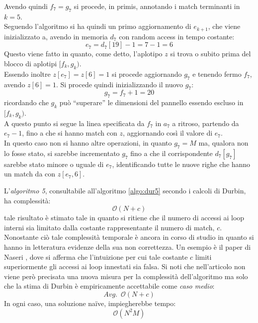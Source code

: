 \begin{esempio}
  Avendo quindi $f_7=g_7$ si procede, in primis, annotando i match terminanti in
  $k=5$.\\
  Seguendo l'algoritmo si ha quindi un primo aggiornamento di $e_{k+1}$, che
  viene inizializzato a, avendo in memoria $d_7$ con random access in tempo
  costante: 
  \[e_7=d_7[19]-1=7-1=6\]
  Questo viene fatto in quanto, come detto, l'aplotipo $z$ si trova o subito
  prima del blocco di aplotipi $[f_k,g_k)$.\\
  Essendo inoltre $z[e_7]=z[6]=1$ si procede aggiornando $g_7$ e tenendo fermo
  $f_7$, avendo $z[6]=1$. Si procede quindi inizializzando il
  nuovo $g_7$:
  \[g_7=f_7+1=20\]
  ricordando che $g_k$ può ``superare'' le dimensioni del pannello essendo
  escluso in $[f_k,g_k)$.\\
  A questo punto si segue la linea specificata da $f_7$ in $a_7$ a ritroso,
  partendo da $e_7-1$, fino a che si hanno match con $z$, aggiornando così il
  valore di $e_7$.\\
  In questo caso non si hanno altre operazioni, in quanto $g_7=M$ ma, qualora
  non lo fosse stato, si sarebbe incrementato $g_7$ fino a che il corrispondente
  $d_7[g_7]$ sarebbe stato minore o uguale di $e_7$, identificando tutte le
  nuove righe che hanno un match da con $z[e_7, 6]$.
\end{esempio}
L'\textit{algoritmo 5}, consultabile all'algoritmo \ref{algo:dur5} secondo i
calcoli di Durbin, ha complessità:
\begin{equation}
  \label{eq:pbwtsmem5}
  \mathcal{O}(N+c)
\end{equation}
tale risultato è stimato tale in quanto si ritiene che il
numero di accessi ai loop interni sia limitato dalla costante rappresentante il
numero di match, $c$. Nonostante ciò tale complessità temporale è ancora in
corso di studio in quanto si hanno in letteratura evidenze della sua non
correttezza. Un esempio è il paper di Naseri \cite{dpbwt}, dove si afferma che
l'intuizione per cui tale costante $c$ limiti superiormente gli accessi ai loop
innestati sia falsa. Si noti che nell'articolo non viene però precisata una
nuova misura per la complessità dell'algoritmo ma solo che la stima di Durbin è
empiricamente accettabile come \textit{caso medio}:
\begin{equation}
  \label{eq:pbwtsmem6}
  Avg.\,\,\,\mathcal{O}(N+c)
\end{equation}
In ogni caso, una soluzione na\"{i}ve, impiegherebbe tempo:
\begin{equation}
  \label{eq:pbwtsmem7}
  \mathcal{O}(N^2M)
\end{equation}
